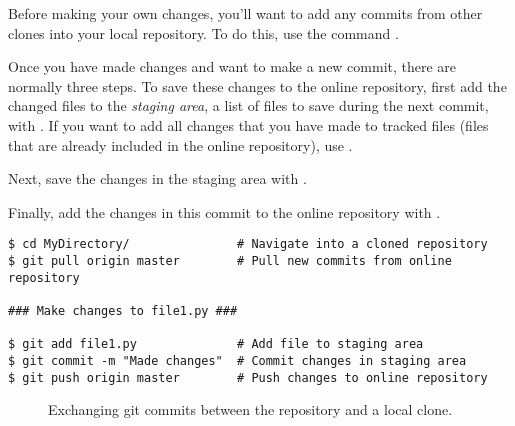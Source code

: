 Before making your own changes, you'll want to add any commits from other clones into your local repository.
To do this, use the command .

Once you have made changes and want to make a new commit, there are normally three steps.
To save these changes to the online repository, first add the changed files to the \emph{staging area}, a list of files to save during the next commit, with .
If you want to add all changes that you have made to tracked files (files that are already included in the online repository), use .

Next, save the changes in the staging area with .

Finally, add the changes in this commit to the online repository with .

\begin{lstlisting}
$ cd MyDirectory/				# Navigate into a cloned repository
$ git pull origin master		# Pull new commits from online repository

### Make changes to file1.py ###

$ git add file1.py				# Add file to staging area
$ git commit -m "Made changes" 	# Commit changes in staging area
$ git push origin master 		# Push changes to online repository
\end{lstlisting}


\begin{figure}[H]
\centering
{}
\caption{Exchanging git commits between the repository and a local clone.}
\end{figure}

